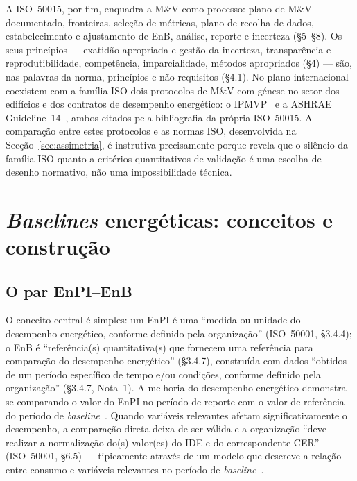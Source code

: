 A ISO~50015, por fim, enquadra a M\&V como processo: plano de M\&V documentado, fronteiras, seleção de métricas, plano de recolha de dados, estabelecimento e ajustamento de EnB, análise, reporte e incerteza (\S5--\S8). Os seus princípios --- exatidão apropriada e gestão da incerteza, transparência e reprodutibilidade, competência, imparcialidade, métodos apropriados (\S4) --- são, nas palavras da norma, princípios e não requisitos (\S4.1). No plano internacional coexistem com a família ISO dois protocolos de M\&V com génese no setor dos edifícios e dos contratos de desempenho energético: o IPMVP~\cite{IPMVP_2022} e a ASHRAE Guideline~14~\cite{ASHRAE14_2014}, ambos citados pela bibliografia da própria ISO~50015. A comparação entre estes protocolos e as normas ISO, desenvolvida na Secção~\ref{sec:assimetria}, é instrutiva precisamente porque revela que o silêncio da família ISO quanto a critérios quantitativos de validação é uma escolha de desenho normativo, não uma impossibilidade técnica.

\section{\emph{Baselines} energéticas: conceitos e construção}
\label{sec:enb}

\subsection{O par EnPI--EnB}
\label{sec:enb-par}

O conceito central é simples: um EnPI é uma \enquote{medida ou unidade do desempenho energético, conforme definido pela organização} (ISO~50001, \S3.4.4); o EnB é \enquote{referência(s) quantitativa(s) que fornecem uma referência para comparação do desempenho energético} (\S3.4.7), construída com dados \enquote{obtidos de um período específico de tempo e/ou condições, conforme definido pela organização} (\S3.4.7, Nota~1). A melhoria do desempenho energético demonstra-se comparando o valor do EnPI no período de reporte com o valor de referência do período de \emph{baseline}~\cite[Figuras~1 e~3]{ISO50006_2014}. Quando variáveis relevantes afetam significativamente o desempenho, a comparação direta deixa de ser válida e a organização \enquote{deve realizar a normalização do(s) valor(es) do IDE e do correspondente CER} (ISO~50001, \S6.5) --- tipicamente através de um modelo que descreve a relação entre consumo e variáveis relevantes no período de \emph{baseline}~\cite[\S4.5.1 e Anexo~D]{ISO50006_2014}.

